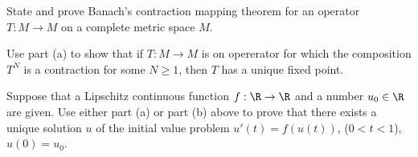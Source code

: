 \begin{alist}
\item State and prove Banach's contraction mapping theorem for an operator
$T:M\rightarrow M$ on a complete metric space $M$.
\item Use part (a) to show that if $T:M\rightarrow M$ is on opererator
for which the composition $T^N$ is a contraction for some $N\geq 1$,
then $T$ has a unique fixed point.
\item Suppose that a Lipschitz continuous function $f:\R\rightarrow
\R$ and a number $u_0\in \R$ are given. Use either part (a) or part
(b) above to prove that there exists a unique solution $u$ of the initial
value problem $u'(t)=f(u(t))$, ($0<t<1$), $u(0)=u_0$.
\end{alist}
